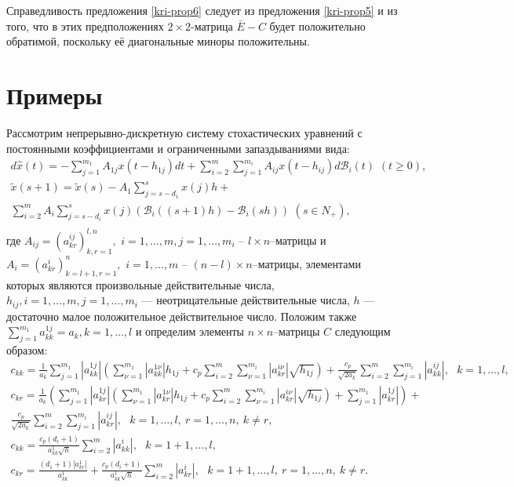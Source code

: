 Справедливость предложения \ref{kri-prop6} следует из предложения \ref{kri-prop5} и из того, что в этих предположениях $2\times 2$-матрица $\bar E - C$ будет
положительно обратимой, поскольку её диагональные миноры положительны.


\section{Примеры}
 Рассмотрим непрерывно-дискретную систему
стохастических уравнений с постоянными коэффициентами и
ограниченными запаздываниями вида:
\begin{equation}\label{kri-10}
\begin{array}{crl}
 d\hat x(t) = - \sum
 \limits_{j=1}^{m_1}A_{1j}x(t - h_{1j})dt +
 \sum \limits_{i=2}^m\sum \limits_{j=1}^{m_i}
 A_{ij}x(t - h_{ij})d\mathcal B_i(t) \, \, (t \ge 0),\\
\tilde x(s+1) = \tilde x(s) - A_{1}\sum \limits _{j=s -d_1 }^{s}
x(j)h + \\
\sum \limits _{i=2}^{m}A_{i}\sum \limits _{j=s-d_i}^{s}
x(j)(\mathcal B_i((s+1)h) - \mathcal B_i(sh))\, \,  (s
\in N_+),\\
\end{array}
\end{equation}
где  $A_{ij}=(a^{ij}_{kr})_{k,r=1}^{l,n}, \,\,i = 1,\dots,m, j =
1,\dots,m_i$ -- $l \times n$--матрицы и $A_i =
(a^i_{kr})_{k=l+1,r=1}^n, \,\,i = 1,\dots,m$ -- $(n-l)\times
n$--матрицы, элементами которых являются произвольные действительные
числа,  $h_{ij}, i = 1,\dots,m, j = 1,\dots,m_i$ --- неотрицательные
действительные числа, $h$ --- достаточно малое положительное
действительное число. Положим также $\sum \limits_{j=1}^{m_1}
a^{1j}_{kk} = a_k, k = 1,\dots,l$ и определим элементы $n\times
n$--матрицы $C$ следующим образом:
$$
\begin{array}{crl}
c_{kk}  = \frac{1}{a _k }\sum \limits_{j =1}^{m_1}
|a^{1j}_{kk}|\left(\sum \limits_{\nu=1}^{m_1} |a^{1\nu}_{kk}|h _{1j}
+ c_p\sum \limits_{i=2}^m \sum \limits_{\nu=1}^{m_i}
|a^{i\nu}_{kr}|\sqrt{h_{1j}}\right) + \frac{c_p}{\sqrt{2a_k }}\sum
\limits_{i=2}^m \sum \limits_{j=1}^{m_i}|a^{ij}_{kk}|, \ \ \ k = 1,\dots,l,\\
c_{kr} = \frac{1}{a _k }\left(\sum \limits_{j
=1}^{m_1}|a^{1j}_{kr}|\left(\sum
\limits_{\nu=1}^{m_1}|a^{1\nu}_{kr}| h_{1j} +  c_p\sum
\limits_{i=2}^m \sum \limits_{\nu=1}^{m_i}
|a^{i\nu}_{kr}|\sqrt{h_{1j}}\right) + \sum \limits_{j=1}^{m_1}
|a^{1j}_{kr}|\right)+ \\
\frac{c_p}{\sqrt{2a_k }}\sum \limits_{i=2}^m \sum
\limits_{j=1}^{m_i} |a^{ij}_{kr}|,  \ \ \ k =
1,\dots,l, \ r = 1, \dots, n, \ k \neq r,\\
 c_{kk} = \frac{c_p(d_i+1)}{a^1_{kk}\sqrt{h}}
\sum\limits _{i=2}^{m}|a^{i}_{kk}|, \ \ \ k = 1 + 1,\dots,l, \\
c_{kr} = \frac{(d_1 + 1)|a^{1}_{kr}|}{a^1_{kk}}
+\frac{c_p(d_i+1)}{a^1_{kk}\sqrt{h}} \sum\limits
_{i=2}^{m}|a^{i}_{kr}|, \ \ \ k = 1 + 1,\dots,l, \ r = 1, \dots, n, \ k
\neq r.
\end{array}
$$

